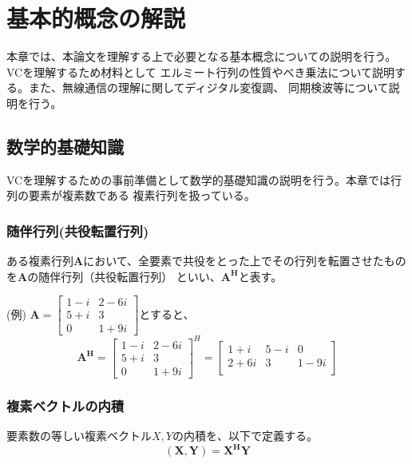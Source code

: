 \chapter{基本的概念の解説}
本章では、本論文を理解する上で必要となる基本概念についての説明を行う。VCを理解するため材料として
エルミート行列の性質やべき乗法について説明する。また、無線通信の理解に関してディジタル変復調、
同期検波等について説明を行う。

\section{数学的基礎知識}
VCを理解するための事前準備として数学的基礎知識の説明を行う。本章では行列の要素が複素数である
複素行列を扱っている。

\subsection{随伴行列(共役転置行列)}
ある複素行列$\bm{A}$において、全要素で共役をとった上でその行列を転置させたものを$\bm{A}$の随伴行列（共役転置行列）
といい、$\bm{A^H}$と表す。

(例)\quad
$
  \bm{A} = \left[
    \begin{array}{cc}
      1-i & 2-6i \\
      5+i & 3 \\
      0 & 1+9i
    \end{array}
  \right]
$とすると、
\vspace{1mm}
\begin{equation}
    \bm{A^H} = \left[
        \begin{array}{cc}
            1-i & 2-6i \\
            5+i & 3 \\
            0 & 1+9i
        \end{array}
    \right]^H 
    = \left[
        \begin{array}{ccc}
            1+i & 5-i & 0 \\
            2+6i & 3 & 1-9i \\
        \end{array}
    \right] \nonumber
\end{equation}

\subsection{複素ベクトルの内積}
要素数の等しい複素ベクトル$X,Y$の内積を、以下で定義する。
\begin{equation}
    (\bm{X},\bm{Y}) = \bm{X^HY}
\end{equation}

